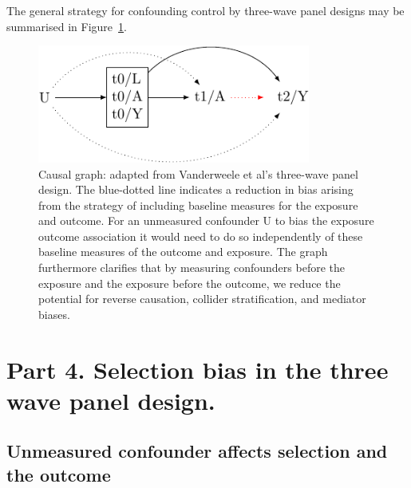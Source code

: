 \documentclass[
  singlecolumn]{report}
\begin{document}
The general strategy for confounding control by three-wave panel designs
may be summarised in Figure~\ref{fig-dag-6}.

\begin{figure}

{\centering \includegraphics[width=0.8\textwidth,height=\textheight]{causal-dags_files/figure-pdf/fig-dag-6-1.pdf}

}

\caption{\label{fig-dag-6}Causal graph: adapted from Vanderweele et al's
three-wave panel design. The blue-dotted line indicates a reduction in
bias arising from the strategy of including baseline measures for the
exposure and outcome. For an unmeasured confounder U to bias the
exposure outcome association it would need to do so independently of
these baseline measures of the outcome and exposure. The graph
furthermore clarifies that by measuring confounders before the exposure
and the exposure before the outcome, we reduce the potential for reverse
causation, collider stratification, and mediator biases.}

\end{figure}

\hypertarget{part-4.-selection-bias-in-the-three-wave-panel-design.}{%
\section{Part 4. Selection bias in the three wave panel
design.}\label{part-4.-selection-bias-in-the-three-wave-panel-design.}}

\hypertarget{unmeasured-confounder-affects-selection-and-the-outcome}{%
\subsection{Unmeasured confounder affects selection and the
outcome}\label{unmeasured-confounder-affects-selection-and-the-outcome}}
\end{document}
